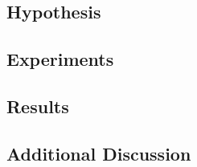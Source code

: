 
\subsection{Hypothesis}
\subsection{Experiments}
\subsection{Results}
\subsection{Additional Discussion}